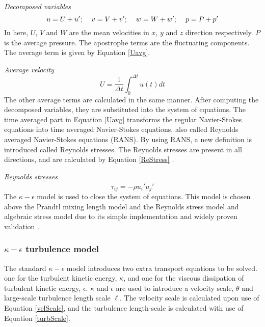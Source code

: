 \documentclass{CFD2017}
\begin{document}
\emph{Decomposed variables}
\begin{equation}
\label{decomposed}
u=U+u'; \hspace{4mm} v = V+v'; \hspace{4mm} w=W+w'; \hspace{4mm} p=P+p' 
\end{equation}
In here, $U$, $V$ and $W$ are the mean velocities in $x$, $y$ and $z$ direction respectively. $P$ is the average pressure. The apostrophe terms are the fluctuating components. The average term is given by Equation \ref{Uavg}.\vspace{2mm}

\emph{Average velocity}
\begin{equation}
\label{Uavg}
U = \frac{1}{\Delta t}\int_{0}^{\Delta t}u(t)dt
\end{equation}
The other average terms are calculated in the same manner. After computing the decomposed variables, they are substituted into the system of equations. The time averaged part in Equation \ref{Uavg} transforms the regular Navier-Stokes equations into time averaged Navier-Stokes equations, also called Reynolds averaged Navier-Stokes equations (RANS). By using RANS, a new definition is introduced called Reynolds stresses. The Reynolds stresses are present in all directions, and are calculated by Equation \ref{ReStress} \cite{slides}. \vspace{2mm}

\emph{Reynolds stresses}
\begin{equation}
\label{ReStress}
\tau_{ij}=-\rho\overline{u_i'u_j'}
\end{equation}
The $\kappa-\epsilon$ model is used to close the system of equations. This model is chosen above the Prandtl mixing length model and the Reynolds stress model and algebraic stress model due to its simple implementation and widely proven validation \cite{Versteeg2007}.


\subsubsection{$\kappa-\epsilon$ turbulence model}
The standard  $\kappa-\epsilon$ model introduces two extra transport equations to be solved. one for the turbulent kinetic energy, $\kappa$, and one for the viscous dissipation of turbulent kinetic energy, $\epsilon$.  $\kappa$ and $\epsilon$ are used to introduce a velocity scale, $\theta$ and large-scale turbulence length scale $\ell$. The velocity scale is calculated upon use of Equation \ref{velScale}, and the turbulence length-scale is calculated with use of Equation \ref{turbScale}.\vspace{2mm}
\end{document}
